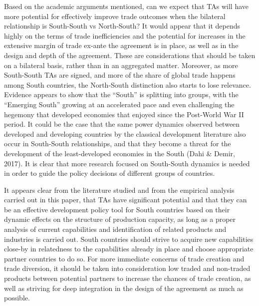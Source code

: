\documentclass[12pt]{article}%
\begin{document}
Based on the academic arguments mentioned, can we expect that TAs will
have more potential for effectively improve trade outcomes when the
bilateral relationship is South-South vs North-South? It would appear
that it depends highly on the terms of trade inefficiencies and the
potential for increases in the extensive margin of trade ex-ante the
agreement is in place, as well as in the design and depth of the
agreement. These are considerations that should be taken on a bilateral
basis, rather than in an aggregated matter. Moreover, as more
South-South TAs are signed, and more of the share of global trade
happens among South countries, the North-South distinction also starts
to lose relevance. Evidence appears to show that the ``South'' is
splitting into groups, with the ``Emerging South'' growing at an
accelerated pace and even challenging the hegemony that developed
economies that enjoyed since the Post-World War II period. It could be
the case that the same power dynamics observed between developed and
developing countries by the classical development literature also occur
in South-South relationships, and that they become a threat for the
development of the least-developed economies in the South (Dahi \&
Demir, 2017). It is clear that more research focused on South-South
dynamics is needed in order to guide the policy decisions of different
groups of countries.

It appears clear from the literature studied and from the empirical
analysis carried out in this paper, that TAs have significant potential
and that they can be an effective development policy tool for South
countries based on their dynamic effects on the structure of production
capacity, as long as a proper analysis of current capabilities and
identification of related products and industries is carried out. South
countries should strive to acquire new capabilities close-by in
relatedness to the capabilities already in place and choose appropriate
partner countries to do so. For more immediate concerns of trade
creation and trade diversion, it should be taken into consideration low
traded and non-traded products between potential partners to increase
the chances of trade creation, as well as striving for deep integration
in the design of the agreement as much as possible.

%
\end{document}
